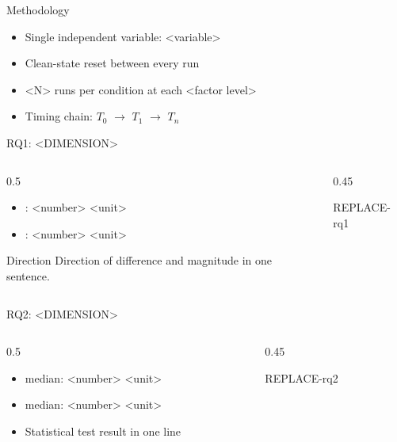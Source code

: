 \documentclass[aspectratio=169,12pt]{beamer}
\begin{document}
\begin{frame}{Methodology}
  \begin{itemize}
    \item Single independent variable: <variable>
    \item Clean-state reset between every run
    \item <N> runs per condition at each <factor level>
    \item Timing chain: $T_0$ $\to$ $T_1$ $\to$ $T_n$
  \end{itemize}
\end{frame}

\begin{frame}{RQ1: <DIMENSION>}
  \begin{columns}[T]
    \begin{column}{0.5\textwidth}
      \begin{itemize}
        \item <Comparator A>: <number> <unit>
        \item <Comparator B>: <number> <unit>
      \end{itemize}
      \begin{alertblock}{Direction}
        Direction of difference and magnitude in one sentence.
      \end{alertblock}
    \end{column}
    \begin{column}{0.45\textwidth}
      \fbox{\rule{0pt}{4.5cm}\rule{\textwidth}{0pt}}
      \begin{center}\footnotesize REPLACE-rq1\end{center}
    \end{column}
  \end{columns}
\end{frame}

\begin{frame}{RQ2: <DIMENSION>}
  \begin{columns}[T]
    \begin{column}{0.5\textwidth}
      \begin{itemize}
        \item <Comparator A> median: <number> <unit>
        \item <Comparator B> median: <number> <unit>
        \item Statistical test result in one line
      \end{itemize}
    \end{column}
    \begin{column}{0.45\textwidth}
      \fbox{\rule{0pt}{4.5cm}\rule{\textwidth}{0pt}}
      \begin{center}\footnotesize REPLACE-rq2\end{center}
    \end{column}
  \end{columns}
\end{frame}
\end{document}
